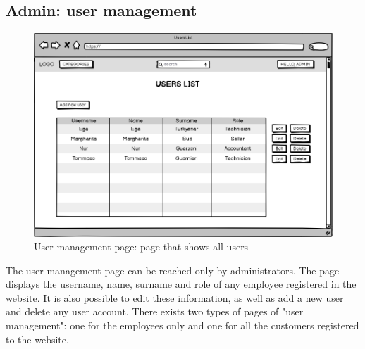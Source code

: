 \subsection{Admin: user management}
    \begin{figure}[H]
        \centering
        \includegraphics[width=\textwidth,height=0.7\textheight,keepaspectratio]{mockups/usersListPageMockup.png}
            \caption{User management page: page that shows all users}
            \label{fig:UserManagement}
    \end{figure}
    The user management page can be reached only by administrators. The page displays the username, name, surname and role of any employee registered in the website. It is also possible to edit these information, as well as add a new user and delete any user account.
    There exists two types of pages of "user management": one for the employees only and one for all the customers registered to the website.

